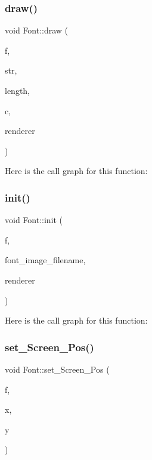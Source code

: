 \subsubsection{\texorpdfstring{draw()}{draw()}}
{\footnotesize\ttfamily void Font\+::draw (\begin{DoxyParamCaption}\item[{\mbox{\hyperlink{struct_font_1_1_font}{Font}} $\ast$}]{f,  }\item[{const char $\ast$}]{str,  }\item[{int}]{length,  }\item[{const \mbox{\hyperlink{struct_grid___camera_1_1_grid___camera}{Grid\+\_\+\+Camera\+::\+Grid\+\_\+\+Camera}} $\ast$}]{c,  }\item[{const S\+D\+L\+\_\+\+Renderer $\ast$}]{renderer }\end{DoxyParamCaption})}

Here is the call graph for this function\+:
\mbox{\label{namespace_font_af6ab17f036035c118e97b51c03a90926}} 
\subsubsection{\texorpdfstring{init()}{init()}}
{\footnotesize\ttfamily void Font\+::init (\begin{DoxyParamCaption}\item[{\mbox{\hyperlink{struct_font_1_1_font}{Font}} $\ast$}]{f,  }\item[{const char $\ast$}]{font\+\_\+image\+\_\+filename,  }\item[{const S\+D\+L\+\_\+\+Renderer $\ast$}]{renderer }\end{DoxyParamCaption})}

Here is the call graph for this function\+:
\mbox{\label{namespace_font_a872717bb42284aaaf8cce742f25d675e}} 
\subsubsection{\texorpdfstring{set\+\_\+\+Screen\+\_\+\+Pos()}{set\_Screen\_Pos()}}
{\footnotesize\ttfamily void Font\+::set\+\_\+\+Screen\+\_\+\+Pos (\begin{DoxyParamCaption}\item[{\mbox{\hyperlink{struct_font_1_1_font}{Font}} $\ast$}]{f,  }\item[{float}]{x,  }\item[{float}]{y }\end{DoxyParamCaption})}

